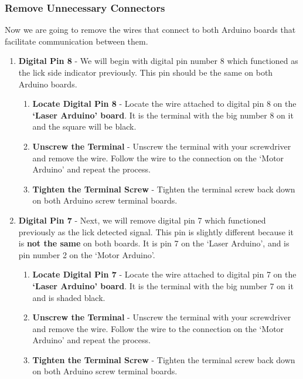 \documentclass{article}
\begin{document}
\subsubsection{Remove Unnecessary Connectors}
Now we are going to remove the wires that connect to both Arduino boards that facilitate communication between them. 
\begin{enumerate}
    \item \textbf{Digital Pin 8} - We will begin with digital pin number 8 which functioned as the lick side indicator previously. This pin should be the same on both Arduino boards.
        \begin{enumerate}
            \item \textbf{Locate Digital Pin 8} - Locate the wire attached to digital pin 8 on the \textbf{`Laser Arduino' board}. It is the terminal with the big number 8 on it and the 
                square will be black.
            \item \textbf{Unscrew the Terminal} - Unscrew the terminal with your screwdriver and remove the wire. Follow the wire to the connection on the `Motor Arduino' and repeat 
                the process.
            \item \textbf{Tighten the Terminal Screw} - Tighten the terminal screw back down on both Arduino screw terminal boards. 
        \end{enumerate}
    \item  \textbf{Digital Pin 7} - Next, we will remove digital pin 7 which functioned previously as the lick detected signal. This pin is slightly different because it is 
        \textbf{not the same} on both boards. It is pin 7 on the `Laser Arduino', and is pin number 2 on the `Motor Arduino'.
        \begin{enumerate}
            \item \textbf{Locate Digital Pin 7} - Locate the wire attached to digital pin 7 on the \textbf{`Laser Arduino' board}. It is the terminal with the big number 7 on it and 
                is shaded black.
            \item \textbf{Unscrew the Terminal} - Unscrew the terminal with your screwdriver and remove the wire. Follow the wire to the connection on the `Motor Arduino' and repeat 
                the process.
            \item \textbf{Tighten the Terminal Screw} - Tighten the terminal screw back down on both Arduino screw terminal boards. 
        \end{enumerate}
\end{enumerate}
\end{document}
